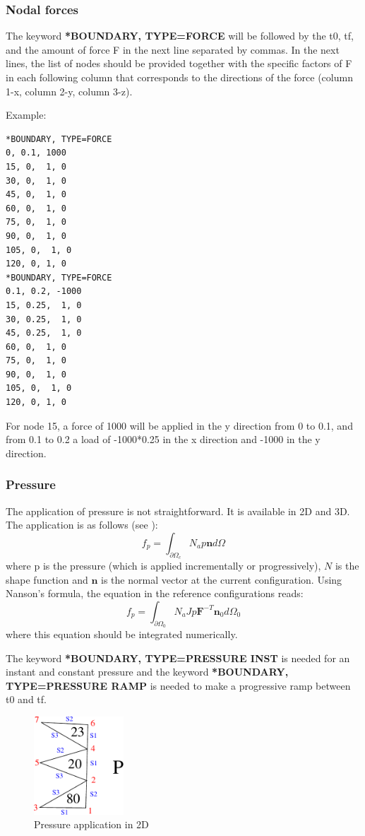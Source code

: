\documentclass[oneside,11pt,times]{book}
\begin{document}
\subsubsection{Nodal forces}
The keyword \textbf{*BOUNDARY, TYPE=FORCE} will be followed by the t0, tf, and the amount of force F in the next line separated by commas. In the next lines, the list of nodes should be provided together with the specific factors of F in each following column that corresponds to the directions of the force (column 1-x, column 2-y, column 3-z).

Example:
\begin{lstlisting}
*BOUNDARY, TYPE=FORCE
0, 0.1, 1000
15, 0,  1, 0
30, 0,  1, 0
45, 0,  1, 0
60, 0,  1, 0
75, 0,  1, 0
90, 0,  1, 0
105, 0,  1, 0
120, 0, 1, 0
*BOUNDARY, TYPE=FORCE
0.1, 0.2, -1000
15, 0.25,  1, 0
30, 0.25,  1, 0
45, 0.25,  1, 0
60, 0,  1, 0
75, 0,  1, 0
90, 0,  1, 0
105, 0,  1, 0
120, 0, 1, 0
\end{lstlisting}

For node 15, a force of 1000 will be applied in the y direction from 0 to 0.1, and from 0.1 to 0.2 a load of -1000*0.25 in the x direction and -1000 in the y direction.

\subsubsection{Pressure}
The application of pressure is not straightforward. It is available in 2D and 3D. The application is as follows (see \citep{zienkiewicz:2014}):
\begin{equation}
f_p=\int_{\partial\Omega_c}N_ap\mathbf{n}d\Omega
\end{equation}
where p is the pressure (which is applied incrementally or progressively), $N$ is the shape function and $\mathbf{n}$ is the normal vector at the current configuration. Using Nanson's formula, the equation in the reference configurations reads:
\begin{equation}
f_p=\int_{\partial\Omega_0}N_aJp\mathbf{F}^{-T}\mathbf{n}_0d\Omega_0
\end{equation}
where this equation should be integrated numerically.

The keyword \textbf{*BOUNDARY, TYPE=PRESSURE INST} is needed for an instant and constant pressure and the keyword \textbf{*BOUNDARY, TYPE=PRESSURE RAMP} is needed to make a progressive ramp between t0 and tf.

\begin{figure}[htb]
    \centering
    \includegraphics[width=0.3\textwidth]{imgs/UserManual/pressure.pdf}
    \caption{Pressure application in 2D}
    \label{fig:pressure}
\end{figure}
\end{document}
